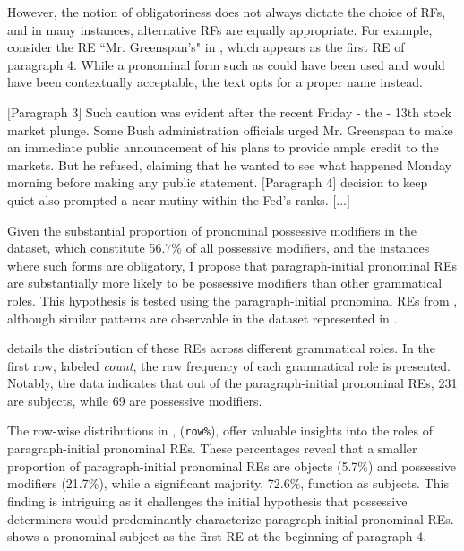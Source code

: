 However, the notion of obligatoriness does not always dictate the choice of RFs, and in many instances, alternative RFs are equally appropriate. For example, consider the RE ``Mr. Greenspan's" in , which appears as the first RE of paragraph 4. While a pronominal form such as  could have been used and would have been contextually acceptable, the text opts for a proper name instead.

\begin{exe}
	\ex \example{wsj-0598}
	\begin{xlist}
		\ex $[$Paragraph 3$]$ Such caution was evident after the recent Friday - the - 13th stock market plunge. Some Bush administration officials urged Mr. Greenspan to make an immediate public announcement of his plans to provide
		ample credit to the markets. But he refused, claiming that he wanted to see what happened Monday morning before making any public statement.
		\ex\label{ex:greenspanposs} $[$Paragraph 4$]$  decision to keep quiet also prompted a near-mutiny within the Fed's ranks. $[$...$]$
		
	\end{xlist}
\end{exe}


Given the substantial proportion of pronominal possessive modifiers in the dataset, which constitute 56.7\% of all possessive modifiers, and the instances where such forms are obligatory, I propose that paragraph-initial pronominal REs are substantially more likely to be possessive modifiers than other grammatical roles. This hypothesis is tested using the paragraph-initial pronominal REs from , although similar patterns are observable in the dataset represented in .

 details the distribution of these REs across different grammatical roles. In the first row, labeled \textit{count}, the raw frequency of each grammatical role is presented. Notably, the data indicates that out of the paragraph-initial pronominal REs, 231 are subjects, while 69 are possessive modifiers.




The row-wise distributions in , (\texttt{row\%}), offer valuable insights into the roles of paragraph-initial pronominal REs. These percentages reveal that a smaller proportion of paragraph-initial pronominal REs are objects (5.7\%) and possessive modifiers (21.7\%), while a significant majority, 72.6\%, function as subjects. This finding is intriguing as it challenges the initial hypothesis that possessive determiners would predominantly characterize paragraph-initial pronominal REs.  shows a pronominal subject as the first RE at the beginning of paragraph 4.


